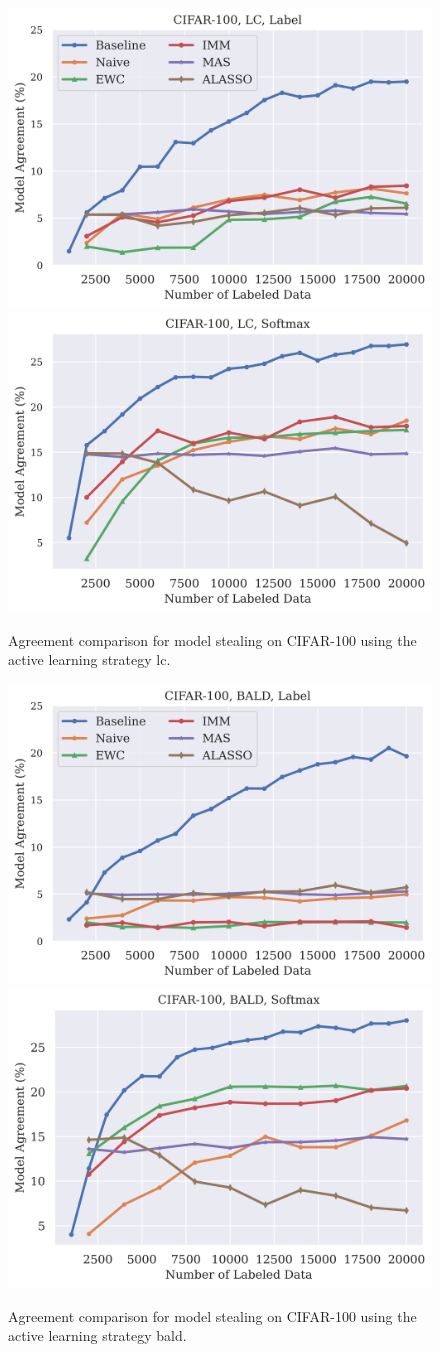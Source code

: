 \begin{figure}[!htb]
    \centering
    \includegraphics[width=0.48\linewidth]{images/results_CALMS/cifar100_label_lc.png} \hfill
    \includegraphics[width=0.48\linewidth]{images/results_CALMS/cifar100_softmax_lc.png}
    \caption{Agreement comparison for model stealing on CIFAR-100 using the active learning strategy \gls{lc}.}
    \label{fig:CALMSCIFAR100LC}
\end{figure}

\begin{figure}[!htb]
    \centering
    \includegraphics[width=0.48\linewidth]{images/results_CALMS/cifar100_label_bald.png} \hfill
    \includegraphics[width=0.48\linewidth]{images/results_CALMS/cifar100_softmax_bald.png}
    \caption{Agreement comparison for model stealing on CIFAR-100 using the active learning strategy \gls{bald}.}
    \label{fig:CALMSCIFAR100BALD}
\end{figure}

